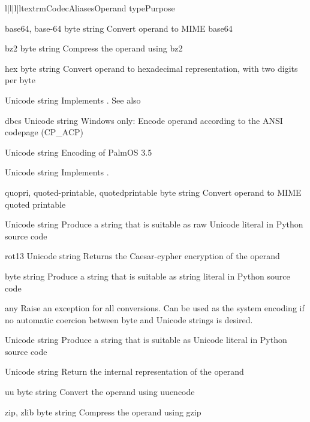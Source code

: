 \begin{tableiv}{l|l|l|l}{textrm}{Codec}{Aliases}{Operand type}{Purpose}

         {base64, base-64}
         {byte string}
         {Convert operand to MIME base64}

         {bz2}
         {byte string}
         {Compress the operand using bz2}

         {hex}
         {byte string}
         {Convert operand to hexadecimal representation, with two
          digits per byte}

         {}
         {Unicode string}
         {Implements .
          See also }

         {dbcs}
         {Unicode string}
         {Windows only: Encode operand according to the ANSI codepage (CP_ACP)}

         {}
         {Unicode string}
         {Encoding of PalmOS 3.5}

         {}
         {Unicode string}
         {Implements .
          }

         {quopri, quoted-printable, quotedprintable}
         {byte string}
         {Convert operand to MIME quoted printable}

         {}
         {Unicode string}
         {Produce a string that is suitable as raw Unicode literal in
          Python source code}

         {rot13}
         {Unicode string}
         {Returns the Caesar-cypher encryption of the operand}

         {}
         {byte string}
         {Produce a string that is suitable as string literal in
          Python source code}

         {}
         {any}
         {Raise an exception for all conversions. Can be used as the
          system encoding if no automatic coercion between byte and
          Unicode strings is desired.} 

         {}
         {Unicode string}
         {Produce a string that is suitable as Unicode literal in
          Python source code}

         {}
         {Unicode string}
         {Return the internal representation of the operand}

         {uu}
         {byte string}
         {Convert the operand using uuencode}

         {zip, zlib}
         {byte string}
         {Compress the operand using gzip}

\end{tableiv}

